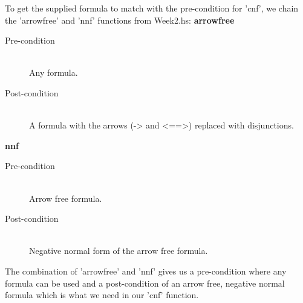 \documentclass{article}
\begin{document}
To get the supplied formula to match with the pre-condition for 'cnf', we chain the 'arrowfree' and 'nnf' functions from Week2.hs:
\textbf{arrowfree}
\begin{description}
  \item[Pre-condition] \hfill \\
  Any formula.
  \item[Post-condition] \hfill \\
  A formula with the arrows (-> and <==>) replaced with disjunctions.
\end{description}

\textbf{nnf}
\begin{description}
  \item[Pre-condition] \hfill \\
  Arrow free formula.
  \item[Post-condition] \hfill \\
  Negative normal form of the arrow free formula.
\end{description}
The combination of 'arrowfree' and 'nnf' gives us a pre-condition where any formula can be used and a post-condition of an arrow free, negative normal formula which is what we need in our 'cnf' function.
\end{document}
